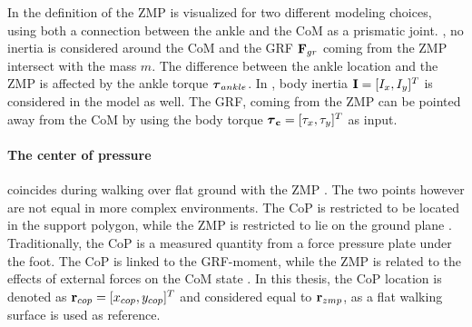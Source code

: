 In  the definition of the \ac{ZMP} is visualized for two different modeling choices, using both a connection between the ankle and the \ac{CoM} as a prismatic joint. , no inertia is considered around the \ac{CoM} and the \ac{GRF} $\mathbf{F}_{gr}$ coming from the \ac{ZMP} intersect with the mass $m$. The difference between the ankle location and the \ac{ZMP} is affected by the ankle torque $\boldsymbol{\tau}_{ankle}$. In , body inertia $\mathbf{I} = [I_x, I_y]^T$ is considered in the model as well. The \ac{GRF}, coming from the \ac{ZMP} can be pointed away from the \ac{CoM} by using the body torque $\boldsymbol{\tau}_{\mathbf{c}} = [\tau_x, \tau_y]^T$ as input. 

\paragraph{The center of pressure} coincides during walking over flat ground with the \ac{ZMP} \cite{vukobratovic2004zero}. The two points however are not equal in more complex environments. The \ac{CoP} is restricted to be located in the support polygon, while the \ac{ZMP} is restricted to lie on the ground plane  \cite{sardain2004forces}. Traditionally, the \ac{CoP} is a measured quantity from a force pressure plate under the foot. The \ac{CoP} is linked to the \ac{GRF}-moment, while the \ac{ZMP} is related to the effects of external forces on the \ac{CoM} state \cite{sardain2004forces}. In this thesis, the \ac{CoP} location is denoted as $\mathbf{r}_{cop} = [x_{cop}, y_{cop}]^T$ and considered equal to $\mathbf{r}_{zmp}$, as a flat walking surface is used as reference.

